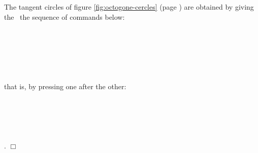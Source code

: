 \begin{corrige}{
The tangent circles of figure \ref{fig:octogone-cercles} (page \pageref{fig:octogone-cercles})
are obtained by giving the \robot\ the sequence of commands \hbox{below:}\\
\hspace*{2ex}{\idt etr()}\\
\hspace*{2ex}{\idt cr();\ cr();\ cr();\ cr();\ cr();\ cr()}\\
\hspace*{2ex}{\idt etl()}\\
\hspace*{2ex}{\idt cl();\ cl();\ cl();\ cl();\ cl();\ cl()}\\
\hspace*{2ex}{\idt etl()}\\
\hspace*{2ex}{\idt cr();\ cr();\ cr();\ cr()}\\
that is, by pressing one after the \hbox{other:}\\
\hspace*{1ex} \\
\hspace*{1ex}\touche{)} \touche{)} \touche{)} \touche{)} \touche{)} \touche{)} \\
\hspace*{1ex} \\
\hspace*{1ex}\touche{(} \touche{(} \touche{(} \touche{(} \touche{(} \touche{(} \\
\hspace*{1ex} \\
\hspace*{1ex}\touche{)} \touche{)} \touche{)} \touche{)}.
$\Box$}\end{corrige}

